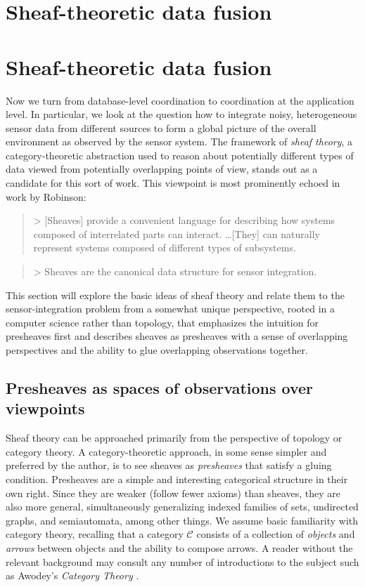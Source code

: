 \section{Sheaf-theoretic data fusion}

\section{Sheaf-theoretic data fusion}

Now we turn from database-level coordination to coordination at the application level. In particular, we look at the question how to integrate noisy, heterogeneous sensor data from different sources to form a global picture of the overall environment as observed by the sensor system. The framework of \emph{sheaf theory}, a category-theoretic abstraction used to reason about potentially different types of data viewed from potentially overlapping points of view, stands out as a candidate for this sort of work. This viewpoint is most prominently echoed in work by Robinson:
\begin{quote}
>   [Sheaves] provide a convenient language for describing how systems composed of interrelated parts can interact. \ldots [They] can naturally represent systems composed of different types of subsystems. \cite{2020robinsonPseudometric}
\end{quote}
\begin{quote}
>   Sheaves are the canonical data structure for sensor integration. \cite{2017robinsonCanonical}
\end{quote}
This section will explore the basic ideas of sheaf theory and relate them to the sensor-integration problem from a somewhat unique perspective, rooted in a computer science rather than topology, that emphasizes the intuition for presheaves first and describes sheaves as presheaves with a sense of overlapping perspectives and the ability to glue overlapping observations together.

\subsection{Presheaves as spaces of observations over viewpoints}

Sheaf theory can be approached primarily from the perspective of topology or category theory. A category-theoretic approach, in some sense simpler and preferred by the author, is to see sheaves as \emph{presheaves} that satisfy a gluing condition. Presheaves are a simple and interesting categorical structure in their own right. Since they are weaker (follow fewer axioms) than sheaves, they are also more general, simultaneously generalizing indexed families of sets, undirected graphs, and semiautomata, among other things. We assume basic familiarity with category theory, recalling that a category $\mathcal{C}$ consists of a collection of \emph{objects} and \emph{arrows} between objects and the ability to compose arrows. A reader without the relevant background may consult any number of introductions to the subject such as Awodey's \emph{Category Theory} \cite{10.5555/2060081}.


